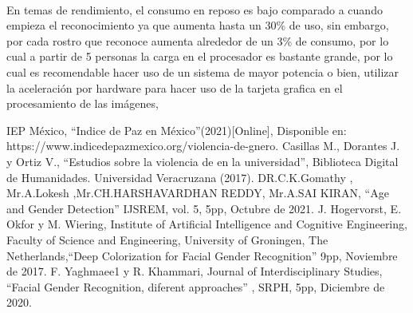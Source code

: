 \documentclass[9pt]{report}
\begin{document}
\begin{multicols}{2}
	\paragraph{}
	En temas de rendimiento, el consumo en reposo es bajo comparado a cuando empieza el reconocimiento ya que aumenta hasta un 30\% de uso, sin embargo, por cada rostro que reconoce aumenta alrededor de un 3\% de consumo, por lo cual a partir de 5 personas la carga en el procesador es bastante grande, por lo cual es recomendable hacer uso de un sistema de mayor potencia o bien, utilizar la aceleración por hardware para hacer uso de la tarjeta grafica en el procesamiento de las imágenes,
	\begin{thebibliography}{0}
			 IEP México, ``Indice de Paz en México''(2021)[Online], Disponible en: https://www.indicedepazmexico.org/violencia-de-gnero.
			 Casillas M., Dorantes J. y Ortiz V., ``Estudios sobre la violencia de en la universidad'', Biblioteca Digital de Humanidades. Universidad Veracruzana (2017).
			 DR.C.K.Gomathy , Mr.A.Lokesh ,Mr.CH.HARSHAVARDHAN REDDY, Mr.A.SAI KIRAN, ``Age and Gender Detection'' IJSREM, vol. 5, 5pp, Octubre de 2021.
			 J. Hogervorst, E. Okfor y M. Wiering, Institute of Artificial Intelligence and Cognitive Engineering, Faculty of Science and Engineering, University of Groningen, The Netherlands,``Deep Colorization for Facial Gender Recognition'' 9pp, Noviembre de 2017.
			 F. Yaghmaee1 y R. Khammari, Journal of Interdisciplinary Studies, ``Facial Gender Recognition, diferent approaches'' , SRPH, 5pp, Diciembre de 2020.			

	\end{thebibliography}	
	\end{multicols}
\end{document}
